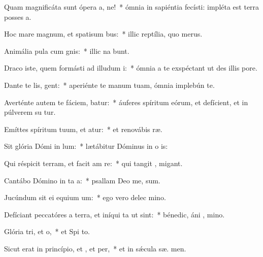 \item Quam magnificáta sunt ópera a, ne!~* ómnia in sapiéntia fecísti: impléta est terra posses a.
\item Hoc mare magnum, et spatisum bus:~* illic reptília, quo   merus.
\item Animália pula cum gnis:~* illic na bunt.
\item Draco iste, quem formásti ad illudum i:~* ómnia a te exspéctant ut des illis   pore.
\item Dante te lis, gent:~* aperiénte te manum tuam, ómnia implebún te.
\item Averténte autem te fáciem, batur:~* áuferes spíritum eórum, et defícient, et in púlverem su tur.
\item Emíttes spíritum tuum, et atur:~* et renovábis  ræ.
\item Sit glória Dómi in lum:~* lætábitur Dóminus in o is:
\item Qui réspicit terram, et facit am re:~* qui tangit ,  migant.
\item Cantábo Dómino in ta a:~* psallam Deo me,  sum.
\item Jucúndum sit ei equium um:~* ego vero delec  mino.
\item Defíciant peccatóres a terra, et iníqui ta ut  sint:~* bénedic, áni , mino.
\item Glória tri, et o,~* et Spi to.
\item Sicut erat in princípio, et , et per,~* et in sǽcula sæ. men.
